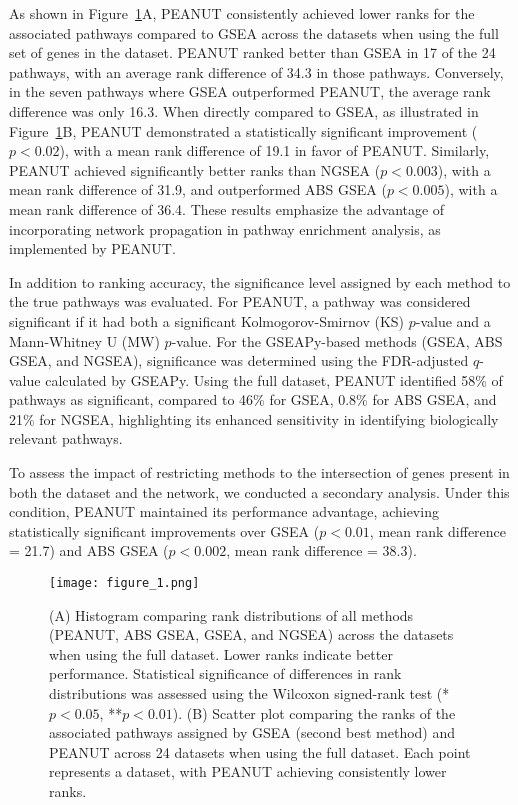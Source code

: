 \documentclass{article}
\begin{document}
As shown in Figure~\ref{fig:rank_comparison_alpha_0.2}A, PEANUT consistently achieved lower ranks for the associated pathways compared to GSEA across the datasets when using the full set of genes in the dataset. PEANUT ranked better than GSEA in 17 of the 24 pathways, with an average rank difference of 34.3 in those pathways. Conversely, in the seven pathways where GSEA outperformed PEANUT, the average rank difference was only 16.3. When directly compared to GSEA, as illustrated in Figure~\ref{fig:rank_comparison_alpha_0.2}B, PEANUT demonstrated a statistically significant improvement ($p<0.02$), with a mean rank difference of 19.1 in favor of PEANUT. Similarly, PEANUT achieved significantly better ranks than NGSEA ($p<0.003$), with a mean rank difference of 31.9, and outperformed ABS GSEA ($p<0.005$), with a mean rank difference of 36.4. These results emphasize the advantage of incorporating network propagation in pathway enrichment analysis, as implemented by PEANUT.

In addition to ranking accuracy, the significance level assigned by each method to the true pathways was evaluated. For PEANUT, a pathway was considered significant if it had both a significant Kolmogorov-Smirnov (KS) $p$-value and a Mann-Whitney U (MW) $p$-value. For the GSEAPy-based methods (GSEA, ABS GSEA, and NGSEA), significance was determined using the FDR-adjusted $q$-value calculated by GSEAPy. Using the full dataset, PEANUT identified 58\% of pathways as significant, compared to 46\% for GSEA, 0.8\% for ABS GSEA, and 21\% for NGSEA, highlighting its enhanced sensitivity in identifying biologically relevant pathways.

To assess the impact of restricting methods to the intersection of genes present in both the dataset and the network, we conducted a secondary analysis. Under this condition, PEANUT maintained its performance advantage, achieving statistically significant improvements over GSEA ($p<0.01$, mean rank difference = 21.7) and ABS GSEA ($p<0.002$, mean rank difference = 38.3).

\begin{figure}[ht]
    \centering
    \texttt{[image: figure\_1.png]}
    \caption{(A) Histogram comparing rank distributions of all methods (PEANUT, ABS GSEA, GSEA, and NGSEA) across the datasets when using the full dataset. Lower ranks indicate better performance. Statistical significance of differences in rank distributions was assessed using the Wilcoxon signed-rank test (*$p < 0.05$, **$p < 0.01$). (B) Scatter plot comparing the ranks of the associated pathways assigned by GSEA (second best method) and PEANUT across 24 datasets when using the full dataset. Each point represents a dataset, with PEANUT achieving consistently lower ranks.}
    \label{fig:rank_comparison_alpha_0.2}
\end{figure}
\end{document}
